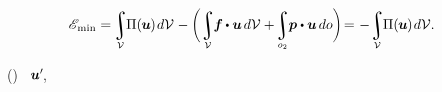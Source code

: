 \nopagebreak\vspace{-0.33em}\begin{equation*}
\potentialenergyfunctional_{\hspace{-0.1ex}\text{min}}
= \hspace{-0.2ex}
\scalebox{0.9}{$\displaystyle\integral\displaylimits_{\mathcal{V}}$} \hspace{-0.2ex}
\potential(\hspace{-0.1ex}\bm{u}\hspace{-0.1ex}) \hspace{.2ex} d\mathcal{V} \hspace{.1ex}
- \scalebox{0.88}[1]{$\biggl($} \hspace{.1ex}
\scalebox{0.9}{$\displaystyle\integral\displaylimits_{\mathcal{V}}$} \hspace{-0.2ex}
\bm{f} \hspace{-0.1ex} \dotp \bm{u} \hspace{.3ex} d\mathcal{V}
+ \hspace{-0.3ex}
\scalebox{0.9}{$\displaystyle\integral\displaylimits_{o_2}$} \hspace{-0.1ex}
\bm{p} \dotp \bm{u} \hspace{.33ex} do
\scalebox{0.88}[1]{$\biggr)$} \hspace{-0.3ex}
= \hspace{.1ex} - \hspace{.1ex}
\scalebox{0.9}{$\displaystyle\integral\displaylimits_{\mathcal{V}}$} \hspace{-0.2ex}
\potential(\hspace{-0.1ex}\bm{u}\hspace{-0.1ex}) \hspace{.2ex} d\mathcal{V}
.
\vspace{-0.1em}\end{equation*}

  ~() ~${\bm{u}'\hspace{-0.25ex}}$,  

